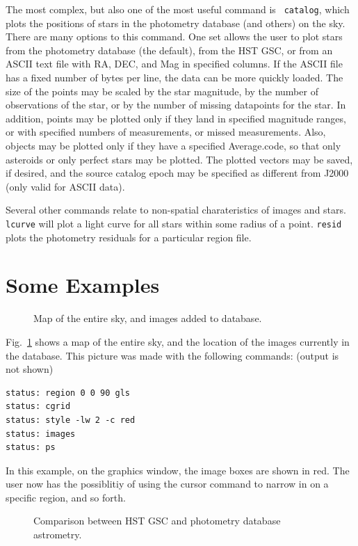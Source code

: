 \documentclass{article}
\begin{document}
The most complex, but also one of the most useful command is {\tt
  catalog}, which plots the positions of stars in the photometry
database (and others) on the sky.  There are many options to this
command.  One set allows the user to plot stars from the photometry
database (the default), from the HST GSC, or from an ASCII text file
with RA, DEC, and Mag in specified columns.  If the ASCII file has a
fixed number of bytes per line, the data can be more quickly loaded.
The size of the points may be scaled by the star magnitude, by the
number of observations of the star, or by the number of missing
datapoints for the star.  In addition, points may be plotted only if
they land in specified magnitude ranges, or with specified numbers of
measurements, or missed measurements.  Also, objects may be plotted
only if they have a specified Average.code, so that only asteroids or
only perfect stars may be plotted.  The plotted vectors may be saved,
if desired, and the source catalog epoch may be specified as different
from J2000 (only valid for ASCII data).

Several other commands relate to non-spatial charateristics of images
and stars.  {\tt lcurve} will plot a light curve for all stars within
some radius of a point.  {\tt resid} plots the photometry residuals
for a particular region file.  

\section{Some Examples}

\begin{figure}
\caption{\label{allsky} \small
  Map of the entire sky, and images added to database.  }
\end{figure}

Fig.~\ref{allsky} shows a map of the entire sky, and the location
of the images currently in the database.  This picture was made with
the following commands: (output is not shown) \\
\begin{verbatim}
status: region 0 0 90 gls
status: cgrid
status: style -lw 2 -c red 
status: images
status: ps
\end{verbatim}
In this example, on the graphics window, the image boxes are shown in
red.  The user now has the possiblitiy of using the cursor command to
narrow in on a specific region, and so forth.  

\begin{figure}
\caption{\label{catalog} \small
  Comparison between HST GSC and photometry database astrometry.  }
\end{figure}
\end{document}
